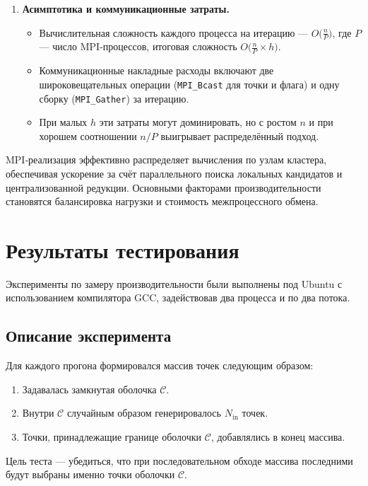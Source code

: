 \documentclass[12pt,a4paper]{article}
\begin{document}
\begin{enumerate}
  \item \textbf{Асимптотика и коммуникационные затраты.}  
    \begin{itemize}
      \item Вычислительная сложность каждого процесса на итерацию — \(O\bigl(\tfrac{n}{P}\bigr)\), где \(P\) — число MPI‑процессов, итоговая сложность \(O\bigl(\tfrac{n}{P}\times h\bigr)\).  
      \item Коммуникационные накладные расходы включают две широковещательных операции (\texttt{MPI\_Bcast} для точки и флага) и одну сборку (\texttt{MPI\_Gather}) за итерацию.  
      \item При малых \(h\) эти затраты могут доминировать, но с ростом \(n\) и при хорошем соотношении \(n/P\) выигрывает распределённый подход.
    \end{itemize}
\end{enumerate}

MPI‑реализация эффективно распределяет вычисления по узлам кластера, обеспечивая ускорение за счёт параллельного поиска локальных кандидатов и централизованной редукции. Основными факторами производительности становятся балансировка нагрузки и стоимость межпроцессного обмена.

\section{Результаты тестирования}

Эксперименты по замеру производительности были выполнены под Ubuntu с использованием компилятора GCC, задействовав два процесса и по два потока.

\subsection*{Описание эксперимента}
Для каждого прогона формировался массив точек следующим образом:
\begin{enumerate}
  \item Задавалась замкнутая оболочка \(\mathcal{C}\).
  \item Внутри \(\mathcal{C}\) случайным образом генерировалось \(N_{\mathrm{in}}\) точек.
  \item Точки, принадлежащие границе оболочки \(\mathcal{C}\), добавлялись в конец массива.
\end{enumerate}

Цель теста — убедиться, что при последовательном обходе массива последними будут выбраны именно точки оболочки \(\mathcal{C}\).
\end{document}
